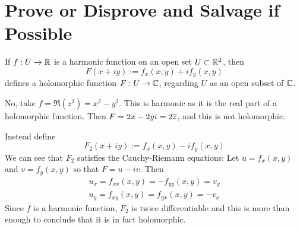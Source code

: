 \documentclass{homework}
\begin{document}
                                                          \section{Prove or Disprove and Salvage if Possible}
                                                          \begin{problem} %
                                                            If $f : U \to \mathbb{R}$ is a harmonic function on an open set $U \subset \mathbb{R}^2$, then 
                                                              \[
                                                                  F(x+iy) := f_x(x,y) + i f_y(x,y) 
                                                                    \]
                                                                      defines a holomorphic function $F : U \to \mathbb{C}$, regarding $U$ as an
                                                                        open subset of $\mathbb{C}$.
                                                                        \end{problem} 
                                                                        \begin{solution}
                                                                        No, take $f=\Re(z^2) = x^2 - y^2$. This is harmonic as it is the real part of a holomorphic function. Then $F = 2x - 2yi = 2\overline{z}$, and this is not holomorphic. 

                                                                        Instead define 
                                                                          \[
                                                                              F_2(x+iy) := f_x(x,y) - i f_y(x,y) 
                                                                                \]
                                                                                We can see that $F_2$ satisfies the Cauchy-Riemann equations: Let $u=f_x(x,y)$ and $v=f_y(x,y)$ so that $F=u-iv$. Then
                                                                                \begin{gather*}
                                                                                u_x = f_{xx}(x, y) = -f_{yy}(x, y) = v_y\\
                                                                                u_y = f_{xy}(x, y) = f_{yx}(x, y) = -v_x
                                                                                \end{gather*}
                                                                                Since $f$ is a harmonic function, $F_2$ is twice differentiable and this is more than enough to conclude that it is in fact holomorphic.
                                                                                \end{solution}
\end{document}
